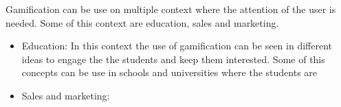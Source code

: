 Gamification can be use on multiple context where the attention of the user is needed. Some of this context are education, sales and marketing.

\begin{itemize}

\item Education: In this context the use of gamification can be seen in different ideas to engage the
the students and keep them interested. Some of this concepts can be use in schools and universities
where the students are 

\item Sales and marketing:

\end{itemize}

